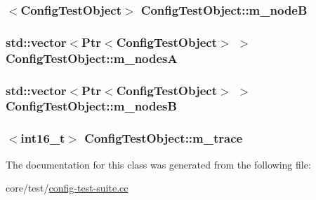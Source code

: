 \subsubsection[{\texorpdfstring{m\+\_\+nodeB}{m_nodeB}}]{$<${\bf Config\+Test\+Object}$>$ Config\+Test\+Object\+::m\+\_\+nodeB\hspace{0.3cm}{\ttfamily [private]}}\hypertarget{classConfigTestObject_ae85745ade88bf5a10e052de02ca688bd}{}\label{classConfigTestObject_ae85745ade88bf5a10e052de02ca688bd}
\subsubsection[{\texorpdfstring{m\+\_\+nodesA}{m_nodesA}}]{\setlength{\rightskip}{0pt plus 5cm}std\+::vector$<${\bf Ptr}$<${\bf Config\+Test\+Object}$>$ $>$ Config\+Test\+Object\+::m\+\_\+nodesA\hspace{0.3cm}{\ttfamily [private]}}\hypertarget{classConfigTestObject_a7f4146e9f981f0d51d3c55275dd7f6fa}{}\label{classConfigTestObject_a7f4146e9f981f0d51d3c55275dd7f6fa}
\subsubsection[{\texorpdfstring{m\+\_\+nodesB}{m_nodesB}}]{\setlength{\rightskip}{0pt plus 5cm}std\+::vector$<${\bf Ptr}$<${\bf Config\+Test\+Object}$>$ $>$ Config\+Test\+Object\+::m\+\_\+nodesB\hspace{0.3cm}{\ttfamily [private]}}\hypertarget{classConfigTestObject_a345fa2548e1d073ddb0e3c718dedf0a1}{}\label{classConfigTestObject_a345fa2548e1d073ddb0e3c718dedf0a1}
\subsubsection[{\texorpdfstring{m\+\_\+trace}{m_trace}}]{$<$int16\+\_\+t$>$ Config\+Test\+Object\+::m\+\_\+trace\hspace{0.3cm}{\ttfamily [private]}}\hypertarget{classConfigTestObject_ad3bbf3fe225edda1977109a35c1b939e}{}\label{classConfigTestObject_ad3bbf3fe225edda1977109a35c1b939e}


The documentation for this class was generated from the following file\+:\begin{DoxyCompactItemize}
\item 
core/test/\hyperlink{config-test-suite_8cc}{config-\/test-\/suite.\+cc}\end{DoxyCompactItemize}
